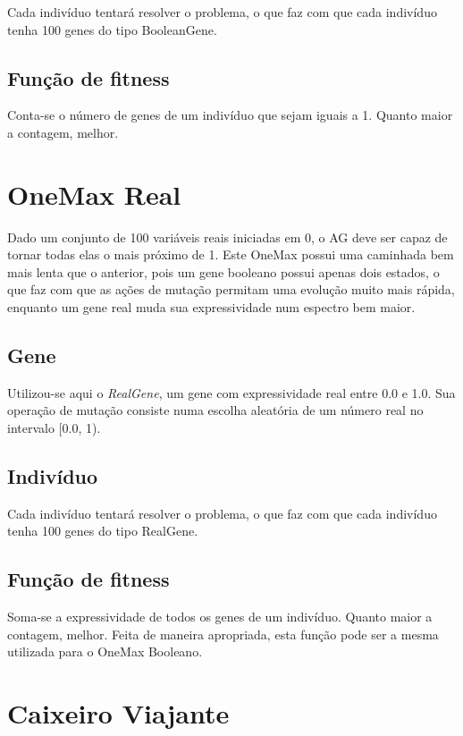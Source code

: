 Cada indivíduo tentará resolver o problema, o que faz com que cada indivíduo tenha 100 genes do tipo BooleanGene.

\subsection*{Função de fitness}

Conta-se o número de genes de um indivíduo que sejam iguais a 1. Quanto maior a contagem, melhor.

\section{OneMax Real}

Dado um conjunto de 100 variáveis reais iniciadas em 0, o AG deve ser capaz de tornar todas elas o mais próximo de 1. Este OneMax possui uma caminhada bem mais lenta que o anterior, pois um gene booleano possui apenas dois estados, o que faz com que as ações de mutação permitam uma evolução muito mais rápida, enquanto um gene real muda sua expressividade num espectro bem maior.

\subsection*{Gene}

Utilizou-se aqui o \emph{RealGene}, um gene com expressividade real entre 0.0 e 1.0. Sua operação de mutação consiste numa escolha aleatória de um número real no intervalo [0.0, 1).

\subsection*{Indivíduo}

Cada indivíduo tentará resolver o problema, o que faz com que cada indivíduo tenha 100 genes do tipo RealGene.

\subsection*{Função de fitness}

Soma-se a expressividade de todos os genes de um indivíduo. Quanto maior a contagem, melhor. Feita de maneira apropriada, esta função pode ser a mesma utilizada para o OneMax Booleano.

\section{Caixeiro Viajante}

